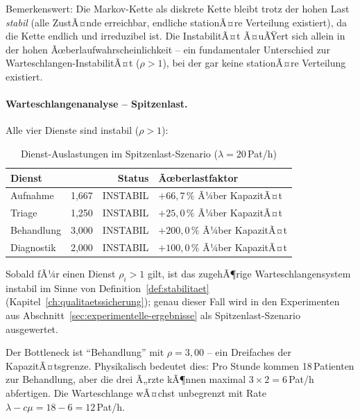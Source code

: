 ﻿\documentclass[a4paper,12pt]{report}
\theoremstyle{definition}
\begin{document}
Bemerkenswert: Die Markov-Kette als diskrete Kette bleibt trotz der hohen
Last \emph{stabil} (alle ZustÃ¤nde erreichbar, endliche stationÃ¤re Verteilung
existiert), da die Kette endlich und irreduzibel ist. Die InstabilitÃ¤t
Ã¤uÃŸert sich allein in der hohen Ãœberlaufwahrscheinlichkeit -- ein
fundamentaler Unterschied zur Warteschlangen-InstabilitÃ¤t ($\rho > 1$),
bei der gar keine stationÃ¤re Verteilung existiert.

\paragraph{Warteschlangenanalyse -- Spitzenlast.}
Alle vier Dienste sind instabil ($\rho > 1$):

\begin{table}[H]
	\centering
	\begin{tabular}{@{}lrrl@{}}
		\toprule
		\textbf{Dienst} & \boldmath{$\rho$} & \textbf{Status} & \textbf{Ãœberlastfaktor} \\
		\midrule
		Aufnahme   & 1{,}667 & INSTABIL & $+66{,}7\,\%$ Ã¼ber KapazitÃ¤t \\
		Triage     & 1{,}250 & INSTABIL & $+25{,}0\,\%$ Ã¼ber KapazitÃ¤t \\
		Behandlung & 3{,}000 & INSTABIL & $+200{,}0\,\%$ Ã¼ber KapazitÃ¤t \\
		Diagnostik & 2{,}000 & INSTABIL & $+100{,}0\,\%$ Ã¼ber KapazitÃ¤t \\
		\bottomrule
	\end{tabular}
	\caption{Dienst-Auslastungen im Spitzenlast-Szenario ($\lambda = 20$\,Pat/h)}
\label{tab:dienst-auslastung-spitzenlast}
	\label{tab:auslastung-hochlast}
\end{table}

Sobald fÃ¼r einen Dienst $\rho_i > 1$ gilt, ist das zugehÃ¶rige Warteschlangensystem instabil im Sinne von Definition~\ref{def:stabilitaet} (Kapitel~\ref{ch:qualitaetssicherung}); genau dieser Fall wird in den Experimenten aus Abschnitt~\ref{sec:experimentelle-ergebnisse} als Spitzenlast-Szenario ausgewertet.

Der Bottleneck ist ``Behandlung'' mit $\rho = 3{,}00$ -- ein Dreifaches
der KapazitÃ¤tsgrenze. Physikalisch bedeutet dies: Pro Stunde kommen
18\,Patienten zur Behandlung, aber die drei Ã„rzte kÃ¶nnen maximal
$3 \times 2 = 6$\,Pat/h abfertigen. Die Warteschlange wÃ¤chst
unbegrenzt mit Rate $\lambda - c\mu = 18 - 6 = 12$\,Pat/h.
\end{document}
